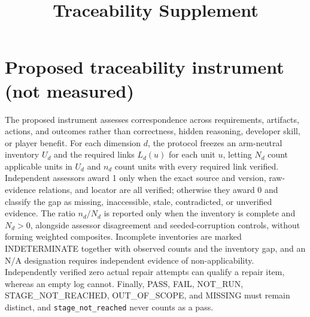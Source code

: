 \documentclass[journal]{IEEEtran}
\title{Traceability Supplement}
\author{}
\begin{document}
\maketitle

\setcounter{table}{13}

\section{Proposed traceability instrument (not measured)}
The proposed instrument assesses correspondence across requirements, artifacts, actions, and outcomes rather than correctness, hidden reasoning, developer skill, or player benefit. For each dimension $d$, the protocol freezes an arm-neutral inventory $U_d$ and the required links $L_d(u)$ for each unit $u$, letting $N_d$ count applicable units in $U_d$ and $n_d$ count units with every required link verified. Independent assessors award 1 only when the exact source and version, raw-evidence relations, and locator are all verified; otherwise they award 0 and classify the gap as missing, inaccessible, stale, contradicted, or unverified evidence. The ratio $n_d/N_d$ is reported only when the inventory is complete and $N_d>0$, alongside assessor disagreement and seeded-corruption controls, without forming weighted composites. Incomplete inventories are marked INDETERMINATE together with observed counts and the inventory gap, and an N/A designation requires independent evidence of non-applicability. Independently verified zero actual repair attempts can qualify a repair item, whereas an empty log cannot. Finally, PASS, FAIL, NOT\_RUN, STAGE\_NOT\_REACHED, OUT\_OF\_SCOPE, and MISSING must remain distinct, and \texttt{stage\_not\_reached} never counts as a pass.
\end{document}
